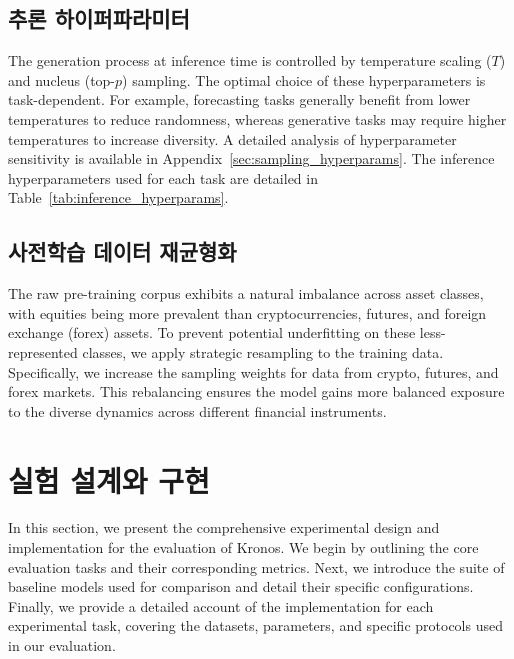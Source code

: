 \subsection{추론 하이퍼파라미터}
The generation process at inference time is controlled by temperature scaling ($T$) and nucleus (top-$p$) sampling. The optimal choice of these hyperparameters is task-dependent. For example, forecasting tasks generally benefit from lower temperatures to reduce randomness, whereas generative tasks may require higher temperatures to increase diversity. A detailed analysis of hyperparameter sensitivity is available in Appendix~\ref{sec:sampling_hyperparams}. The inference hyperparameters used for each task are detailed in Table~\ref{tab:inference_hyperparams}.

\subsection{사전학습 데이터 재균형화}
The raw pre-training corpus exhibits a natural imbalance across asset classes, with equities being more prevalent than cryptocurrencies, futures, and foreign exchange (forex) assets. To prevent potential underfitting on these less-represented classes, we apply strategic resampling to the training data. Specifically, we increase the sampling weights for data from crypto, futures, and forex markets. This rebalancing ensures the model gains more balanced exposure to the diverse dynamics across different financial instruments.

\section{실험 설계와 구현}
\label{sec:exp_setup_details}

In this section, we present the comprehensive experimental design and implementation for the evaluation of Kronos. We begin by outlining the core evaluation tasks and their corresponding metrics. Next, we introduce the suite of baseline models used for comparison and detail their specific configurations. Finally, we provide a detailed account of the implementation for each experimental task, covering the datasets, parameters, and specific protocols used in our evaluation.

